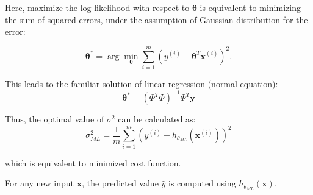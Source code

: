 Here, maximize the log-likelihood with respect to \(\boldsymbol{\theta}\) is equivalent to minimizing the sum of squared
errors, under the assumption of Gaussian distribution for the error:

\begin{equation}
    \boldsymbol{\theta}^* = \arg\min_{\boldsymbol{\theta}} \sum_{i=1}^m \left( y^{(i)} - \boldsymbol{\theta}^T \mathbf{x}^{(i)} \right)^2.
\end{equation}

This leads to the familiar solution of linear regression (normal equation):
\begin{equation}
    \boldsymbol{\theta}^* = (\Phi^T \Phi)^{-1} \Phi^T \mathbf{y}
\end{equation}

Thus, the optimal value of $\sigma^2$ can be calculated as:
\begin{equation}
    \sigma^2_{ML} = \frac{1}{m} \sum_{i=1}^m \left( y^{(i)} - h_{\theta_{ML}}\left(\mathbf{x}^{(i)}\right) \right)^2
\end{equation}

which is equivalent to minimized cost function.

For any new input \(\mathbf{x}\), the predicted value \(\hat{y}\) is computed using \(h_{\theta_{ML}}(\mathbf{x})\).